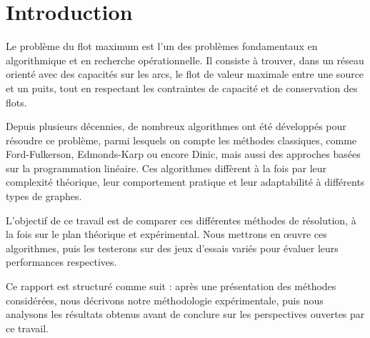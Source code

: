 \documentclass[a4paper]{article}
\begin{document}
\section{Introduction}
Le problème du flot maximum est l’un des problèmes fondamentaux en algorithmique et en recherche opérationnelle. Il consiste à trouver, dans un réseau orienté avec des capacités sur les arcs, le flot de valeur maximale entre une source et un puits, tout en respectant les contraintes de capacité et de conservation des flots.

Depuis plusieurs décennies, de nombreux algorithmes ont été développés pour résoudre ce problème, parmi lesquels on compte les méthodes classiques, comme Ford-Fulkerson, Edmonds-Karp ou encore Dinic, mais aussi des approches basées sur la programmation linéaire. Ces algorithmes diffèrent à la fois par leur complexité théorique, leur comportement pratique et leur adaptabilité à différents types de graphes.

L’objectif de ce travail est de comparer ces différentes méthodes de résolution, à la fois sur le plan théorique et expérimental. Nous mettrons en \oe uvre ces algorithmes, puis les testerons sur des jeux d’essais variés pour évaluer leurs performances respectives.

Ce rapport est structuré comme suit : après une présentation des méthodes considérées, nous décrivons notre méthodologie expérimentale, puis nous analysons les résultats obtenus avant de conclure sur les perspectives ouvertes par ce travail.
\end{document}
